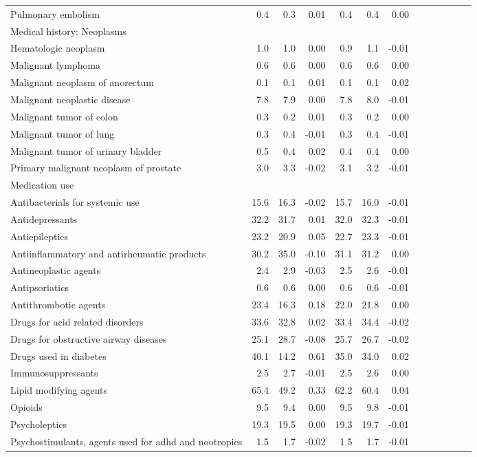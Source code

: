 \documentclass[11pt,]{article}
\begin{document}
\begin{longtable}{lrrrrrrrrrrrr}
      Pulmonary embolism &  0.4 &  0.3 &  0.01 &  0.4 &  0.4 &  0.00 \\ 
  Medical history: Neoplasms &    &    &     &    &    &     \\ 
      Hematologic neoplasm &  1.0 &  1.0 &  0.00 &  0.9 &  1.1 & -0.01 \\ 
      Malignant lymphoma &  0.6 &  0.6 &  0.00 &  0.6 &  0.6 &  0.00 \\ 
      Malignant neoplasm of anorectum &  0.1 &  0.1 &  0.01 &  0.1 &  0.1 &  0.02 \\ 
      Malignant neoplastic disease &  7.8 &  7.9 &  0.00 &  7.8 &  8.0 & -0.01 \\ 
      Malignant tumor of colon &  0.3 &  0.2 &  0.01 &  0.3 &  0.2 &  0.00 \\ 
      Malignant tumor of lung &  0.3 &  0.4 & -0.01 &  0.3 &  0.4 & -0.01 \\ 
      Malignant tumor of urinary bladder &  0.5 &  0.4 &  0.02 &  0.4 &  0.4 &  0.00 \\ 
      Primary malignant neoplasm of prostate &  3.0 &  3.3 & -0.02 &  3.1 &  3.2 & -0.01 \\ 
  Medication use &    &    &     &    &    &     \\ 
      Antibacterials for systemic use & 15.6 & 16.3 & -0.02 & 15.7 & 16.0 & -0.01 \\ 
      Antidepressants & 32.2 & 31.7 &  0.01 & 32.0 & 32.3 & -0.01 \\ 
      Antiepileptics & 23.2 & 20.9 &  0.05 & 22.7 & 23.3 & -0.01 \\ 
      Antiinflammatory and antirheumatic products & 30.2 & 35.0 & -0.10 & 31.1 & 31.2 &  0.00 \\ 
      Antineoplastic agents &  2.4 &  2.9 & -0.03 &  2.5 &  2.6 & -0.01 \\ 
      Antipsoriatics &  0.6 &  0.6 &  0.00 &  0.6 &  0.6 & -0.01 \\ 
      Antithrombotic agents & 23.4 & 16.3 &  0.18 & 22.0 & 21.8 &  0.00 \\ 
      Drugs for acid related disorders & 33.6 & 32.8 &  0.02 & 33.4 & 34.4 & -0.02 \\ 
      Drugs for obstructive airway diseases & 25.1 & 28.7 & -0.08 & 25.7 & 26.7 & -0.02 \\ 
      Drugs used in diabetes & 40.1 & 14.2 &  0.61 & 35.0 & 34.0 &  0.02 \\ 
      Immunosuppressants &  2.5 &  2.7 & -0.01 &  2.5 &  2.6 &  0.00 \\ 
      Lipid modifying agents & 65.4 & 49.2 &  0.33 & 62.2 & 60.4 &  0.04 \\ 
      Opioids &  9.5 &  9.4 &  0.00 &  9.5 &  9.8 & -0.01 \\ 
      Psycholeptics & 19.3 & 19.5 &  0.00 & 19.3 & 19.7 & -0.01 \\ 
      Psychostimulants, agents used for adhd and nootropics &  1.5 &  1.7 & -0.02 &  1.5 &  1.7 & -0.01 \\ 
   \bottomrule\end{longtable}
\end{document}
